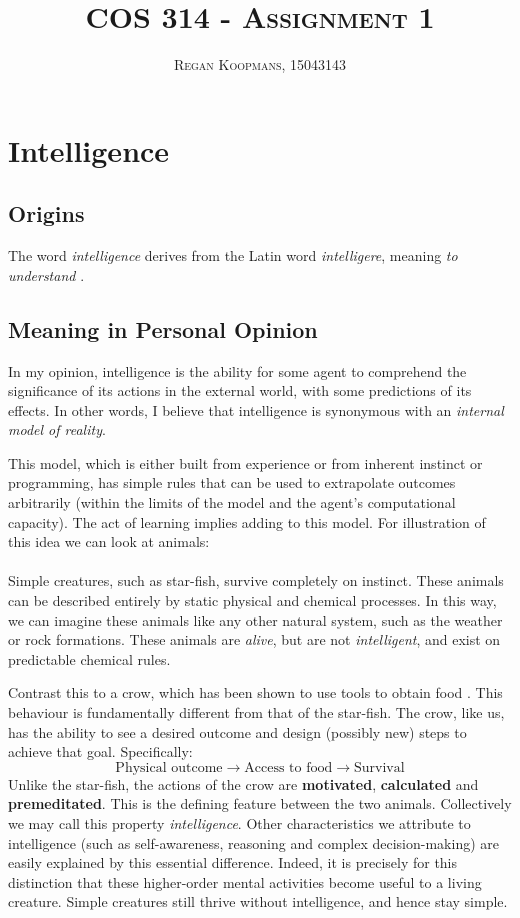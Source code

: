 \documentclass[10pt,a4paper]{article}
\author{\textsc{Regan Koopmans, 15043143}}
\title{\textsc{COS 314 - Assignment 1}}
\begin{document}
		
	\maketitle
		
		\section{Intelligence}
			\subsection{Origins}
				The word \textsl{intelligence} derives from the Latin word \textsl{intelligere}, meaning \textsl{to understand} \cite{etymonline2017}. 
		
			\subsection{Meaning in Personal Opinion}
		
				In my opinion, intelligence is the ability for some agent to comprehend the significance of its actions in the external world, with some predictions of its effects. In other words, I believe that intelligence is synonymous with an \textsl{internal model of reality}. 
				
				This model, which is either built from experience or from inherent instinct or programming, has simple rules that can be used to extrapolate outcomes arbitrarily (within the limits of the model and the agent's computational capacity). The act of learning implies adding to this model. For illustration of this idea we can look at animals:
				\\\\
				Simple creatures, such as star-fish, survive completely on instinct. These animals can be described entirely by static physical and chemical processes. In this way, we can imagine these animals like any other natural system, such as the weather or rock formations. These animals are \textsl{alive}, but are not \textsl{intelligent}, and exist on predictable chemical rules. 
				
				Contrast this to a crow, which has been shown to use tools to obtain food \cites{atlantic2017}. This behaviour is fundamentally different from that of the star-fish. The crow, like us, has the ability to see a desired outcome and design (possibly new) steps to achieve that goal. Specifically:
				\medskip
				\[
				\text{Physical outcome}\rightarrow\text{Access to food}\rightarrow\text{Survival}
				\]
				Unlike the star-fish, the actions of the crow are \textbf{motivated}, \textbf{calculated} and \textbf{premeditated}. This is the defining feature between the two animals. Collectively we may call this property \textsl{intelligence}. Other characteristics we attribute to intelligence (such as self-awareness, reasoning and complex decision-making) are easily explained by this essential difference. Indeed, it is precisely for this distinction that these higher-order mental activities become useful to a living creature. Simple creatures still thrive without intelligence, and hence stay simple. 
				
\end{document}
